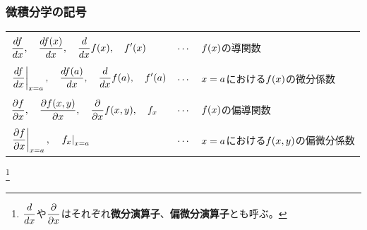 \documentclass[a4j, 9pt]{ltjsarticle}
\begin{document}
      \subsubsection{微積分学の記号}

        \begin{center}
          \begin{tablehere}
            \centering
            \begin{tabular}{lcl}
              
                                                                                                                                                  &               &\\
              $\displaystyle \frac{df}{dx}, \quad \frac{df(x)}{dx}, \quad \frac{d}{dx}f(x), \quad f'(x)$                                                    & $\displaystyle \cdots$  & $\displaystyle f(x)$の導関数\\
                                                                                                                                                  &               &\\
              $\displaystyle \left. \frac{df}{dx} \right|_{x=a}, \quad \frac{df(a)}{dx}, \quad \frac{d}{dx}f(a), \quad f'(a)$                               & $\displaystyle \cdots$  & $\displaystyle x = a$における$\displaystyle f(x)$の微分係数\\
                                                                                                                                                  &               &\\
              $\displaystyle \frac{\partial f}{\partial x}, \quad \frac{\partial f(x, y)}{\partial x}, \quad \frac{\partial}{\partial x}f(x, y), \quad f_x$ & $\displaystyle \cdots$  & $\displaystyle f(x)$の偏導関数\\
                                                                                                                                                  &               &\\
              $\displaystyle \left. \frac{\partial f}{\partial x} \right|_{x=a}, \quad \left. f_x \right|_{x=a}$                                            & $\displaystyle \cdots$  & $\displaystyle x = a$における$\displaystyle f(x, y)$の偏微分係数\\
              
            \end{tabular}
          \end{tablehere}
        \end{center}

        \footnote{
          $\displaystyle \frac{d}{dx}$や$\displaystyle \frac{\partial}{\partial x}$はそれぞれ\textbf{微分演算子}、\textbf{偏微分演算子}とも呼ぶ。
        }
\end{document}
